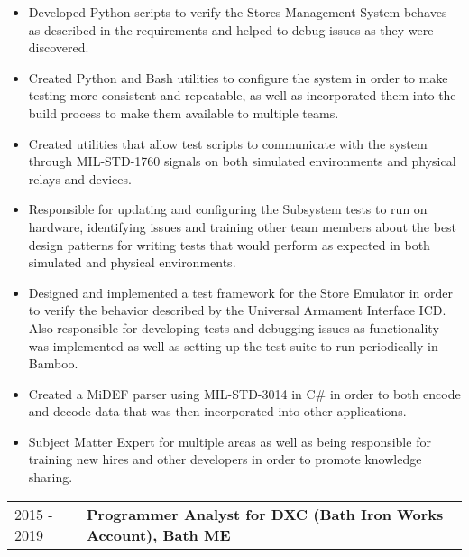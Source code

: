 \documentclass[11pt, letterpaper]{article}
\begin{document}
\begin{itemize}[itemsep=0cm, parsep=0.2cm]
    \item Developed Python scripts to verify the Stores Management System behaves as described in the requirements and helped to debug issues as they were discovered.
    \item Created Python and Bash utilities to configure the system in order to make testing more consistent and repeatable, as well as incorporated them into the build process to make them available to multiple teams.
    \item Created utilities that allow test scripts to communicate with the system through MIL-STD-1760 signals on both simulated environments and physical relays and devices.
    \item Responsible for updating and configuring the Subsystem tests to run on hardware, identifying issues and training other team members about the best design patterns for writing tests that would perform as expected in both simulated and physical environments.
    \item Designed and implemented a test framework for the Store Emulator in order to verify the behavior described by the Universal Armament Interface ICD. Also responsible for developing tests and debugging issues as functionality was implemented as well as setting up the test suite to run periodically in Bamboo.
    \item Created a MiDEF parser using MIL-STD-3014 in C\# in order to both encode and decode data that was then incorporated into other applications.
    \item Subject Matter Expert for multiple areas as well as being responsible for training new hires and other developers in order to promote knowledge sharing.
\end{itemize}
\begin{tabular}{p{0.76in}|p{6.24in}}
    2015 - 2019 & \textbf{Programmer Analyst for DXC (Bath Iron Works Account), Bath ME}
\end{tabular}
\end{document}
